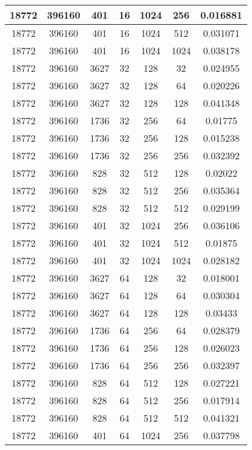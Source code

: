 \documentclass[9pt]{article}
\begin{document}
\begin{tabular}{|c|c|c|c|c|c|c| }
\hline
18772  & 396160  & 401  & 16  & 1024  & 256  & 0.016881 \\
\hline
18772  & 396160  & 401  & 16  & 1024  & 512  & 0.031071 \\
\hline
18772  & 396160  & 401  & 16  & 1024  & 1024  & 0.038178 \\
\hline
18772  & 396160  & 3627  & 32  & 128  & 32  & 0.024955 \\
\hline
18772  & 396160  & 3627  & 32  & 128  & 64  & 0.020226 \\
\hline
18772  & 396160  & 3627  & 32  & 128  & 128  & 0.041348 \\
\hline
18772  & 396160  & 1736  & 32  & 256  & 64  & 0.01775 \\
\hline
18772  & 396160  & 1736  & 32  & 256  & 128  & 0.015238 \\
\hline
18772  & 396160  & 1736  & 32  & 256  & 256  & 0.032392 \\
\hline
18772  & 396160  & 828  & 32  & 512  & 128  & 0.02022 \\
\hline
18772  & 396160  & 828  & 32  & 512  & 256  & 0.035364 \\
\hline
18772  & 396160  & 828  & 32  & 512  & 512  & 0.029199 \\
\hline
18772  & 396160  & 401  & 32  & 1024  & 256  & 0.036106 \\
\hline
18772  & 396160  & 401  & 32  & 1024  & 512  & 0.01875 \\
\hline
18772  & 396160  & 401  & 32  & 1024  & 1024  & 0.028182 \\
\hline
18772  & 396160  & 3627  & 64  & 128  & 32  & 0.018001 \\
\hline
18772  & 396160  & 3627  & 64  & 128  & 64  & 0.030304 \\
\hline
18772  & 396160  & 3627  & 64  & 128  & 128  & 0.03433 \\
\hline
18772  & 396160  & 1736  & 64  & 256  & 64  & 0.028379 \\
\hline
18772  & 396160  & 1736  & 64  & 256  & 128  & 0.026023 \\
\hline
18772  & 396160  & 1736  & 64  & 256  & 256  & 0.032397 \\
\hline
18772  & 396160  & 828  & 64  & 512  & 128  & 0.027221 \\
\hline
18772  & 396160  & 828  & 64  & 512  & 256  & 0.017914 \\
\hline
18772  & 396160  & 828  & 64  & 512  & 512  & 0.041321 \\
\hline
18772  & 396160  & 401  & 64  & 1024  & 256  & 0.037798 \\

\end{tabular}
\end{document}
